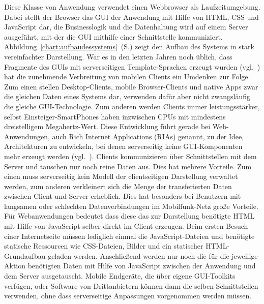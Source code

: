 Diese Klasse von Anwendung verwendet einen Webbrowser als Laufzeitumgebung. Dabei stellt der Browser das GUI der Anwendung mit Hilfe von HTML, CSS und JavaScript dar, die Businesslogik und die Datenhaltung wird auf einem Server ausgeführt, mit der die GUI mithilfe einer Schnittstelle kommuniziert. Abbildung~\ref{chart:aufbaudessystems}~(S.\pageref{chart:aufbaudessystems}) zeigt den Aufbau des Systems in stark vereinfachter Darstellung. War es in den letzten Jahren noch üblich, dass Fragmente des GUIs mit serverseitigen Template-Sprachen erzeugt wurden (vgl.~\cite[S.48]{dunkel2008systemarchitekturen}) hat die zunehmende Verbreitung von mobilen Clients ein Umdenken zur Folge. Zum einen stellen Desktop-Clients, mobile Browser-Clients und native Apps zwar die gleichen Daten eines Systems dar, verwenden dafür aber nicht zwangsläufig die gleiche GUI-Technologie. Zum anderen werden Clients immer leistungsstärker, selbst Einsteiger-SmartPhones haben inzwischen CPUs mit mindestens dreistelligem Megahertz-Wert. Diese Entwicklung führt gerade bei Web-Anwendungen, auch Rich Internet Applications (RIAs) genannt, zu der Idee, Architekturen zu entwickeln, bei denen serverseitig keine GUI-Komponenten mehr erzeugt werden (vgl.~\cite{maccaw2011javascript}). Clients kommunizieren über Schnittstellen mit dem Server und tauschen nur noch reine Daten aus. Dies hat mehrere Vorteile. Zum einen muss serverseitig kein Modell der clientseitigen Darstellung verwaltet werden, zum anderen verkleinert sich die Menge der transferierten Daten zwischen Client und Server erheblich. Dies hat besonders bei Benutzern mit langsamen oder schlechten Datenverbindungen im Mobilfunk-Netz große Vorteile. Für Webanwendungen bedeutet dass diese das zur Darstellung benötigte HTML mit Hilfe von JavaScript selber direkt im Client erzeugen. Beim ersten Besuch einer Internetseite müssen lediglich einmal die JavaScript-Dateien und benötigte statische Ressourcen wie CSS-Dateien, Bilder und ein statischer HTML-Grundaufbau geladen werden. Anschließend werden nur noch die für die jeweilige Aktion benötigten Daten mit Hilfe von JavaScript zwischen der Anwendung und dem Server ausgetauscht. Mobile Endgeräte, die über eigene GUI-Toolkits verfügen, oder Software von Drittanbietern können dann die selben Schnittstellen verwenden, ohne dass serverseitige Anpassungen vorgenommen werden müssen. 


